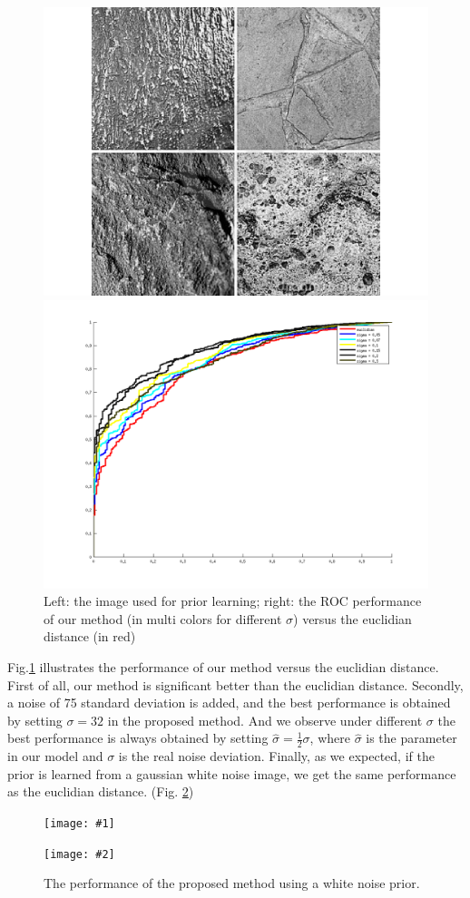 \documentclass[runningheads]{llncs}
\newcommand{\insertTwoF}[5]{
  \begin{figure}[h!]
    \centering
    \begin{minipage}{#4\linewidth}
    \texttt{[image: \#1]}
    \end{minipage}
    \begin{minipage}{#4\linewidth}
    \texttt{[image: \#2]}
    \end{minipage}
      \caption{#3}
      \label{#5}
  \end{figure}  
}
\begin{document}
\begin{figure}[!h]
\begin{minipage}{0.45\linewidth}
    \end{minipage}
    \begin{minipage}{0.45\linewidth}
    \includegraphics[width=\linewidth]{texture}
    \end{minipage}
    \begin{minipage}{0.45\linewidth}
    \includegraphics[width=\linewidth]{perf_texture_max}
    \end{minipage}
      \caption{Left: the image used for prior learning; right:  the ROC performance of our method (in multi colors for different $\sigma$) versus the euclidian distance (in red)}
      \label{perf}
  \end{figure}  
Fig.\ref{perf} illustrates the performance of our method versus the euclidian distance. First of all, our method is significant better than the euclidian distance. Secondly, a noise of 75 standard deviation is added, and the best performance is obtained by setting $\sigma=32$ in the proposed method. And we observe under different $\sigma$ the best performance is always obtained by setting $\hat \sigma=\frac{1}{2} \sigma$, where $\hat \sigma$ is the parameter in our model and $\sigma$ is the real noise deviation. 
Finally, as we expected, if the prior is learned from a gaussian white noise image, we get the same performance as the euclidian distance. (Fig. \ref{wn})
\insertTwoF{wn}{perf_wn_max}{The performance of the proposed method using a white noise prior.}{0.45}{wn}
\end{document}
